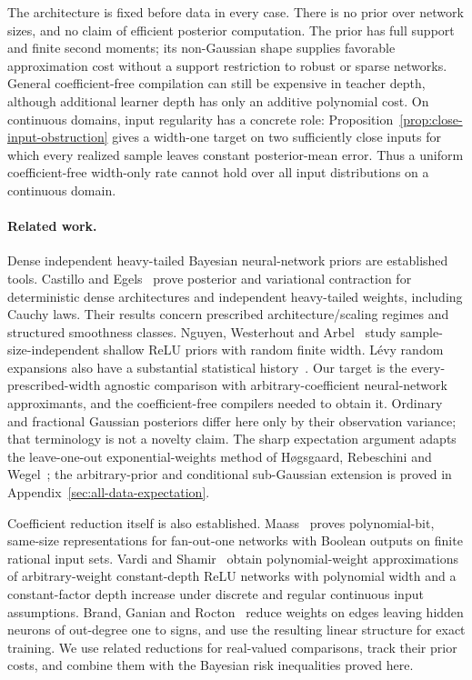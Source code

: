 \documentclass[11pt]{article}
\begin{document}
The architecture is fixed before data in every case. There is no prior over network sizes, and no claim of efficient posterior computation. The prior has full support and finite second moments; its non-Gaussian shape supplies favorable approximation cost without a support restriction to robust or sparse networks. General coefficient-free compilation can still be expensive in teacher depth, although additional learner depth has only an additive polynomial cost. On continuous domains, input regularity has a concrete role: Proposition~\ref{prop:close-input-obstruction} gives a width-one target on two sufficiently close inputs for which every realized sample leaves constant posterior-mean error. Thus a uniform coefficient-free width-only rate cannot hold over all input distributions on a continuous domain.

\paragraph{Related work.}
Dense independent heavy-tailed Bayesian neural-network priors are established tools. Castillo and Egels~\cite{castillo-egels} prove posterior and variational contraction for deterministic dense architectures and independent heavy-tailed weights, including Cauchy laws. Their results concern prescribed architecture/scaling regimes and structured smoothness classes. Nguyen, Westerhout and Arbel~\cite{nguyen} study sample-size-independent shallow ReLU priors with random finite width. L\'evy random expansions also have a substantial statistical history~\cite{wolpert}. Our target is the every-prescribed-width agnostic comparison with arbitrary-coefficient neural-network approximants, and the coefficient-free compilers needed to obtain it. Ordinary and fractional Gaussian posteriors differ here only by their observation variance; that terminology is not a novelty claim. The sharp expectation argument adapts the leave-one-out exponential-weights method of H\o gsgaard, Rebeschini and Wegel~\cite{hrw}; the arbitrary-prior and conditional sub-Gaussian extension is proved in Appendix~\ref{sec:all-data-expectation}.

Coefficient reduction itself is also established. Maass~\cite{maass} proves polynomial-bit, same-size representations for fan-out-one networks with Boolean outputs on finite rational input sets. Vardi and Shamir~\cite{vardi-shamir} obtain polynomial-weight approximations of arbitrary-weight constant-depth ReLU networks with polynomial width and a constant-factor depth increase under discrete and regular continuous input assumptions. Brand, Ganian and Rocton~\cite{brand-ganian-rocton} reduce weights on edges leaving hidden neurons of out-degree one to signs, and use the resulting linear structure for exact training. We use related reductions for real-valued comparisons, track their prior costs, and combine them with the Bayesian risk inequalities proved here.
\end{document}
